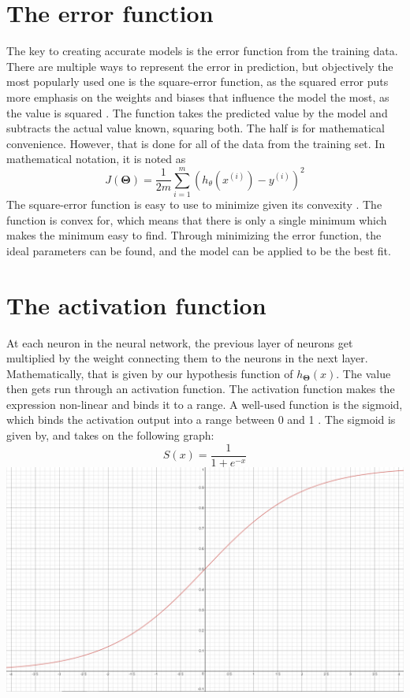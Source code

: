 \documentclass[a4paper,12pt]{article}
\begin{document}
\section{The error function}
The key to creating accurate models is the error function from the training data. There are multiple ways to represent the error in prediction, but objectively the most popularly used one is the square-error function, as the squared error puts more emphasis on the weights and biases that influence the model the most, as the value is squared \cite{patternml}. The function takes the predicted value by the model and subtracts the actual value known, squaring both. The half is for mathematical convenience. However, that is done for all of the data from the training set. In mathematical notation, it is noted as
\[J(\boldsymbol{\Theta}) = \frac{1}{2m} \sum_{i=1}^m (h_\theta(x^{(i)}) - y^{(i)})^2\]
The square-error function is easy to use to minimize given its convexity \cite{convex}. The function is convex for, which means that there is only a single minimum which makes the minimum easy to find. Through minimizing the error function, the ideal parameters can be found, and the model can be applied to be the best fit.

\section{The activation function}
At each neuron in the neural network, the previous layer of neurons get multiplied by the weight connecting them to the neurons in the next layer. Mathematically, that is given by our hypothesis function of $h_{\boldsymbol{\Theta}}(x)$. The value then gets run through an activation function. The activation function makes the expression non-linear and binds it to a range. A well-used function is the sigmoid, which binds the activation output into a range between 0 and 1 \cite{patternml}. The sigmoid is given by, and takes on the following graph:
\[S(x) = \frac{1}{1+e^{-x}}\]
\includegraphics[scale=0.25]{sigmoid}
\end{document}
